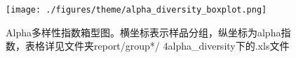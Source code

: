 \documentclass[a4paper,10pt]{article}
\numberwithin{figure}{section}
\numberwithin{table}{section}
\begin{document}
\begin{figure}[H]
 \centering
\captionsetup{width=.8\textwidth,singlelinecheck=false,justification=justified}
\label{Fig:diversity}
\captionsetup{width=.8\textwidth,singlelinecheck=false,justification=justified}
 \texttt{[image: ./figures/theme/alpha\_diversity\_boxplot.png]}
    \caption{Alpha多样性指数箱型图。横坐标表示样品分组，纵坐标为alpha指数，表格详见文件夹report/group*/ 4alpha\_diversity下的.xls文件}
\end{figure}
\end{document}
